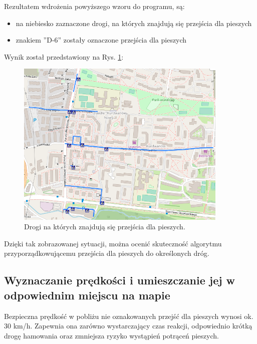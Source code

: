 Rezultatem wdrożenia powyższego wzoru do programu, są:
\begin{itemize}
\item na niebiesko zaznaczone drogi, na których znajdują się przejścia dla pieszych
\item znakiem ''D-6'' zostały oznaczone przejścia dla pieszych
\end{itemize}
Wynik został przedstawiony na Rys. \ref{sec:PrzejscieDrogi}:

\begin{figure}[h]
\caption{Drogi na których znajdują się przejścia dla pieszych.}
\label{sec:PrzejscieDrogi}
\centering
\includegraphics[width=0.9\textwidth]{PrzejscieDrogi}
\end{figure}

Dzięki tak zobrazowanej sytuacji, można ocenić skuteczność algorytmu przyporządkowującemu przejścia dla pieszych do określonych dróg.

\subsection{Wyznaczanie prędkości i umieszczanie jej w odpowiednim miejscu na mapie}

Bezpieczna prędkość w pobliżu nie oznakowanych przejść dla pieszych wynosi ok. 30 km/h. Zapewnia ona zarówno wystarczający czas reakcji, odpowiednio krótką drogę hamowania oraz zmniejsza ryzyko wystąpień potrąceń pieszych.

